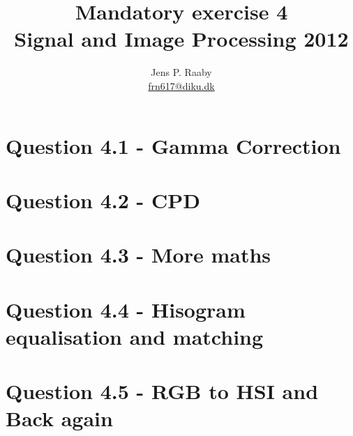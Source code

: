\documentclass{article}
\title{Mandatory exercise 4 \\
Signal and Image Processing 2012}
\author{Jens P. Raaby \\
\url{frn617@diku.dk}}
\begin{document}
 
\maketitle

\section*{Question 4.1 - Gamma Correction}

\section*{Question 4.2 - CPD}

\section*{Question 4.3 - More maths}

\section*{Question 4.4 - Hisogram equalisation and matching}

\section*{Question 4.5 - RGB to HSI and Back again}
 
\end{document}

